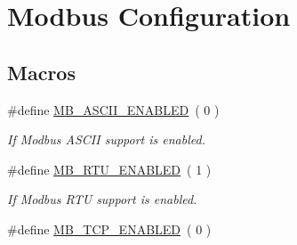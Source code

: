 \hypertarget{group__modbus__cfg}{}\section{Modbus Configuration}
\label{group__modbus__cfg}
\subsection*{Macros}
\begin{DoxyCompactItemize}
\item 
\#define \hyperlink{group__modbus__cfg_gae4accc470cf44e38b4011213a93a2adc}{M\+B\+\_\+\+A\+S\+C\+I\+I\+\_\+\+E\+N\+A\+B\+L\+ED}~(  0 )\hypertarget{group__modbus__cfg_gae4accc470cf44e38b4011213a93a2adc}{}\label{group__modbus__cfg_gae4accc470cf44e38b4011213a93a2adc}

\begin{DoxyCompactList}\small\item\em If Modbus A\+S\+C\+II support is enabled. \end{DoxyCompactList}\item 
\#define \hyperlink{group__modbus__cfg_ga00b7b4d768c9489b5022832db253a71c}{M\+B\+\_\+\+R\+T\+U\+\_\+\+E\+N\+A\+B\+L\+ED}~(  1 )\hypertarget{group__modbus__cfg_ga00b7b4d768c9489b5022832db253a71c}{}\label{group__modbus__cfg_ga00b7b4d768c9489b5022832db253a71c}

\begin{DoxyCompactList}\small\item\em If Modbus R\+TU support is enabled. \end{DoxyCompactList}\item 
\#define \hyperlink{group__modbus__cfg_ga93a17168bbe8c49e45ce6405cb4c1afb}{M\+B\+\_\+\+T\+C\+P\+\_\+\+E\+N\+A\+B\+L\+ED}~(  0 )\hypertarget{group__modbus__cfg_ga93a17168bbe8c49e45ce6405cb4c1afb}{}\label{group__modbus__cfg_ga93a17168bbe8c49e45ce6405cb4c1afb}


\end{DoxyCompactItemize}
